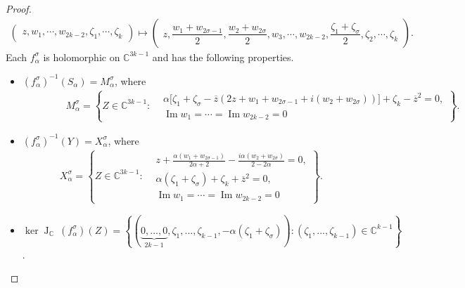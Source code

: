 \documentclass[10pt]{amsart}
\numberwithin{equation}{section}
\theoremstyle{definition}
\theoremstyle{definition}
\theoremstyle{plain}
\newcommand{\beas}{\begin{eqnarray*}}
\newcommand{\eeas}{\end{eqnarray*}}
\newcommand{\zbar}{\overline{z}}
\newcommand{\JacC}{\operatorname{J}_\C\!\:}
\newcommand{\ima}{\operatorname{Im}}
\newcommand{\C} {\mathbb{C}}
\begin{document}
\begin{proof}
	\beas
\begin{pmatrix} z,w_1,\cdots, w_{2k-2}, \zeta_1, \cdots, \zeta_k\end{pmatrix}
	\longmapsto		
		\begin{pmatrix}z,
    		\dfrac{w_1+w_{2\sigma-1}}{2},
    		\dfrac{w_2+w_{2\sigma}}{2},
		 	w_3,
			\cdots,
			w_{2k-2},
			\dfrac{\zeta_1+\zeta_\sigma}{2},
			\zeta_2,
			\cdots,
			\zeta_k \end{pmatrix}.	
	\eeas
Each $f_\alpha^\sigma$ is holomorphic on $\C^{3k-1}$ and has the following properties.
	\begin{itemize}
		\item $(f_\alpha^\sigma)^{-1}(S_\alpha)=M_\alpha^\sigma$, where
					\begin{align*}
					\qquad\qquad	M_\alpha^\sigma=\left\{Z\in\C^{3k-1}:
							\begin{aligned}
								&\alpha\big[\zeta_1+\zeta_\sigma
									-\zbar(2z+w_1+w_{2\sigma-1}+i(w_2+w_{2\sigma}))\big]
										+\zeta_k-\zbar^2=0,\\
								&\ima w_1=\cdots=\ima w_{2k-2}=0
							\end{aligned}
						\right\}.
					\end{align*}
		\item $(f_\alpha^\sigma)^{-1}(Y)=X_\alpha^\sigma$, where
					\begin{align*}
			 			X_\alpha^\sigma=\left\{Z\in\C^{3k-1}:
							\begin{aligned}
								&z+\frac{\alpha (w_1+w_{2\sigma-1})}{2\alpha+2}
									-\frac{i\alpha (w_2+w_{2\sigma})}{2-2\alpha}=0,\\
								&\alpha(\zeta_1 +\zeta_\sigma)+\zeta_k+\zbar^2=0,\\
								&\ima w_1=\cdots=\ima w_{2k-2}=0
							\end{aligned}
						 \right\}.
					\end{align*}
		\item $\ker\JacC(f_\alpha^\sigma)(Z)=\left\{\left(
				\underbrace{0,...,0}_{2k-1},
					\zeta_1,...,\zeta_{k-1},-\alpha(\zeta_1+\zeta_\sigma)\right)
						:(\zeta_1,...,\zeta_{k-1})\in\C^{k-1}\right\}$.
	\end{itemize}


\end{proof}
\end{document}
